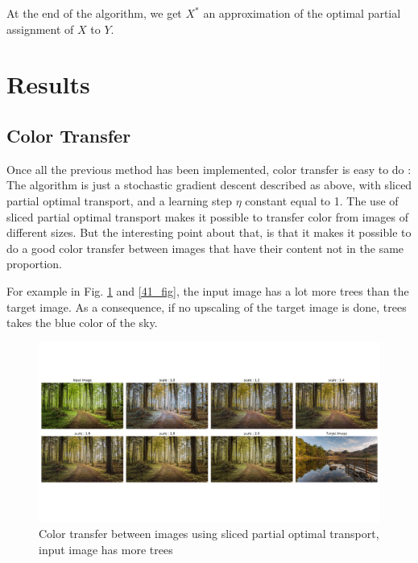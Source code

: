 \documentclass[a4paper,12pt]{article}
\begin{document}
At the end of the algorithm, we get $X^*$ an approximation of the optimal partial assignment of $X$ to $Y$.


\section{Results}

\subsection{Color Transfer}

Once all the previous method has been implemented, color transfer is easy to do : The algorithm is just a stochastic gradient descent described as above, with sliced partial optimal transport, and a learning step $\eta$ constant equal to 1. The use of sliced partial optimal transport makes it possible to transfer color from images of different sizes. But the interesting point about that, is that it makes it possible to do a good color transfer between images that have their content not in the same proportion. 

For example in Fig. \ref{42_fig} and \ref{41_fig}, the input image has a lot more trees than the target image. As a consequence, if no upscaling of the target image is done, trees takes the blue color of the sky.

\begin{figure}[H]
\includegraphics[trim=0cm 3cm 0cm 1.5cm, width = \columnwidth]{landscape42.pdf}
\caption{Color transfer between images using sliced partial optimal transport, input image has more trees}\label{42_fig}
\end{figure}
\end{document}

